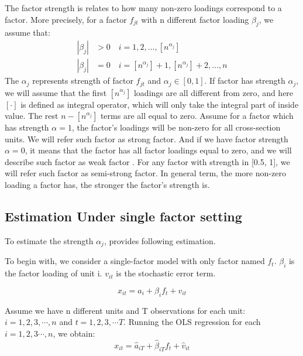The factor strength is relates to how many non-zero loadings correspond to a factor.
More precisely, for a factor $f_{jt}$ with n different factor loading $\beta_{j}$, we assume that:
\begin{align*}
|\beta_{j}| &> 0\quad i = 1, 2,  \dots, [n^{\alpha_j}]\\
|\beta_{j}| &= 0 \quad i = [n^{\alpha_j}] + 1, [n^{\alpha_j}] +2 ,\dots, n
\end{align*}
The $\alpha_j$ represents strength of factor $f_{jt}$ and $\alpha_j \in [0,1]$.
If factor has strength $\alpha_j$, we will assume that the first $[n^{\alpha_j}]$ loadings are all different from zero, and here $[\cdot] $  is defined as integral operator, which will only take the integral part of inside value.%
The rest $n - [n^{\alpha_j}]$ terms are all equal to zero. %
Assume for a factor which has strength $\alpha = 1$, the factor's loadings will be non-zero for all cross-section units.
We will refer such factor as strong factor.
And if we have factor strength $\alpha = 0$, it means that the factor has all factor loadings equal to zero, and we will describe such factor as weak factor \cite{Bailey2016}.
For any factor with strength in [0.5, 1], we will refer such factor as semi-strong factor.
In general term, the more non-zero loading a factor has, the stronger the factor's strength is. 

	\subsection{Estimation Under single factor setting}\label{strength_one_factor_estimation}
To estimate the strength $\alpha_j$,  provides following estimation.

To begin with, we consider a single-factor model with only factor named $f_t$. 
 $\beta_{i}$ is the factor loading of unit i.
$v_{it}$ is the stochastic error term.

\[  x_{it} = a_{i} +  \beta_{i}f_{t} + v_{it} \tag{2} \label{estimation_model}\]

Assume we have n different units and T observations for each unit: $i = 1, 2, 3, \cdots, n$ and $t = 1,2,3, \cdots T$.
Running the OLS regression for each $i = 1,2,3\cdots, n$, we obtain:
\[   x_{it} = \hat{a}_{iT} +  \hat{\beta}_{iT}f_{t} + \hat{v}_{it}  \]

